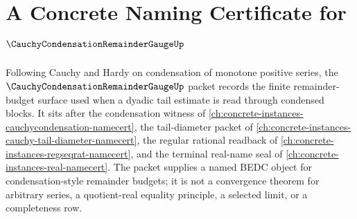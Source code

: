 \chapter{A Concrete Naming Certificate for $\CauchyCondensationRemainderGaugeUp$}
\label{ch:concrete-instances-cauchy-condensation-remainder-gauge-namecert}

Following Cauchy and Hardy on condensation of monotone positive series, the $\CauchyCondensationRemainderGaugeUp$ packet records the finite remainder-budget surface used when a dyadic tail estimate is read through condensed blocks. It sits after the condensation witness of \autoref{ch:concrete-instances-cauchycondensation-namecert}, the tail-diameter packet of \autoref{ch:concrete-instances-cauchy-tail-diameter-namecert}, the regular rational readback of \autoref{ch:concrete-instances-regseqrat-namecert}, and the terminal real-name seal of \autoref{ch:concrete-instances-real-namecert}. The packet supplies a named BEDC object for condensation-style remainder budgets; it is not a convergence theorem for arbitrary series, a quotient-real equality principle, a selected limit, or a completeness row.

